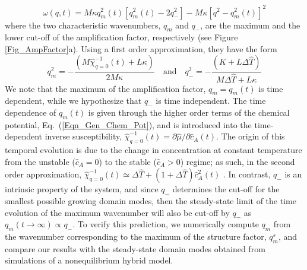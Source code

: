 \documentclass[5p,twocolumn]{elsarticle}
\begin{document}
\begin{equation}\label{Eqn-omega(q)}
    \omega(q,t) = M\kappa q_m^2(t) [q_m^2(t) -2q_-^2]-M\kappa [q^2-q_m^2(t)]^2
\end{equation}
where the two characteristic wavenumbers, $q_m$ and $q_-$, are the maximum and the lower cut-off of the amplification factor, respectively  (see Figure \ref{Fig_AmpFactor}a). Using a first order approximation, they have the form
\begin{equation}\label{Eqn_Char_Wavenums}
    q_m^2 = -\frac{(M\hat{\chi}_{q=0}^{-1}(t)+L\kappa)}{2M\kappa} \quad\text{and}\quad q_-^2 = -\frac{(K+L\Delta\hat{T})}{M\Delta\hat{T}+L\kappa}
\end{equation}
We note that the maximum of the amplification factor, $q_m  = q_m(t)$ is time dependent, while we hypothesize that $q_-$ is time independent. The time dependence of $q_m(t)$ is given through the higher order terms of the chemical potential, Eq.~(\ref{Eqn_Gen_Chem_Pot}), and is introduced into the time-dependent inverse susceptibility, $\hat{\chi}_{q=0}^{-1}(t) = \partial\hat{\mu}/\partial\hat{c}_A(t)$. The origin of this temporal evolution is due to the change in concentration at constant temperature from the unstable ($\hat{c}_A=0$) to the stable ($\hat{c}_A > 0$) regime; as such, in the second order approximation, $\hat{\chi}^{-1}_{q=0}(t) \simeq \Delta\hat{T} + (1+\Delta\hat{T})\hat{c}^2_A(t)$ \cite{MFT_PT_2021,Langer_Theory_1973,Billotet_Dynamic_1980}. In contrast, $q_-$ is an intrinsic property of the system, and since $q_-$ determines the cut-off for the smallest possible growing domain modes, then the steady-state limit of the time evolution of the maximum wavenumber will also be cut-off by $q_-$ as $q_m(t\to\infty) \propto q_-$. To verify this prediction, we numerically compute $q_m$ from the wavenumber corresponding to the maximum of the structure factor, $q_m^s$, and compare our results with the steady-state domain modes obtained from simulations of a nonequilibrium hybrid model.  
\end{document}
